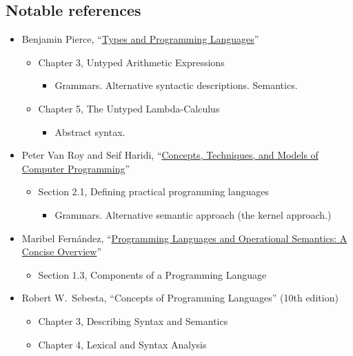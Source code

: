 \documentclass[11pt]{article}
\theoremstyle{definition}
\begin{document}
\subsection{Notable references}
\label{sec:orge39b6fa}
\begin{itemize}
\item Benjamin Pierce,
“\href{https://ebookcentral.proquest.com/lib/mcmu/detail.action?docID=3338823}{Types and Programming Languages}”
\begin{itemize}
\item Chapter 3, Untyped Arithmetic Expressions
\begin{itemize}
\item Grammars. Alternative syntactic descriptions. Semantics.
\end{itemize}
\item Chapter 5, The Untyped Lambda-Calculus
\begin{itemize}
\item Abstract syntax.
\end{itemize}
\end{itemize}

\item Peter Van Roy and Seif Haridi,
“\href{http://citeseerx.ist.psu.edu/viewdoc/download?doi=10.1.1.102.7366\&rep=rep1\&type=pdf}{Concepts, Techniques, and Models of Computer Programming}”
\begin{itemize}
\item Section 2.1, Defining practical programming languages
\begin{itemize}
\item Grammars. Alternative semantic approach (the kernel approach.)
\end{itemize}
\end{itemize}

\item Maribel Fernández,
“\href{https://discovery.mcmaster.ca/iii/encore/record/C\_\_Rb2200622?lang=eng}{Programming Languages and Operational Semantics: A Concise Overview}” 
\begin{itemize}
\item Section 1.3, Components of a Programming Language
\end{itemize}

\item Robert W. Sebesta, “Concepts of Programming Languages” (10th edition)
\begin{itemize}
\item Chapter 3, Describing Syntax and Semantics
\item Chapter 4, Lexical and Syntax Analysis
\end{itemize}
\end{itemize}
\end{document}
